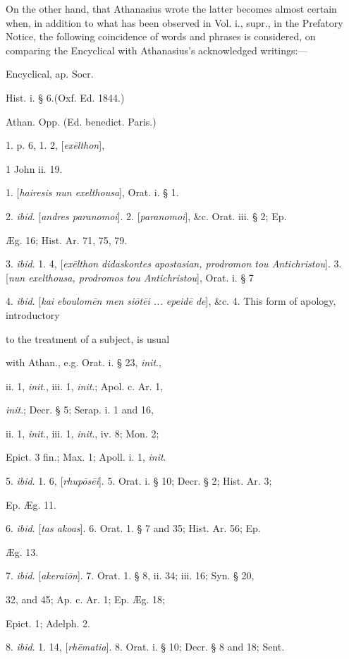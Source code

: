 On the other hand, that Athanasius wrote the
latter becomes almost certain when, in addition to what has been
observed in Vol. i., supr., in the Prefatory Notice, the following
coincidence of words and phrases is considered, on comparing the
Encyclical with Athanasius's acknowledged writings:—

Encyclical, ap. Socr.

Hist. i. § 6.(Oxf. Ed. 1844.)

Athan. Opp. (Ed. benedict. Paris.)

1. p. 6, 1. 2, [\emph{ex\={e}lthon}],

1 John ii. 19.

1. [\emph{hairesis nun exelthousa}], Orat. i. § 1.

2. \emph{ibid}. [\emph{andres paranomoi}].
2. [\emph{paranomoi}], \&c. Orat. iii. § 2;
Ep.

Æg. 16; Hist. Ar. 71, 75, 79.

3. \emph{ibid}. 1. 4, [\emph{ex\={e}lthon didaskontes apostasian, prodromon tou Antichristou}].
3. [\emph{nun exelthousa, prodromos tou Antichristou}], Orat. i. § 7

4. \emph{ibid}. [\emph{kai eboulom\={e}n men si\={o}t\={e}i ... epeid\={e} de}],
\&c.
4. This form of apology, introductory

to the treatment of a subject, is
usual

with Athan., e.g. Orat. i. § 23, \emph{init}.,

ii. 1, \emph{init}., iii. 1, \emph{init}.;
Apol. c. Ar. 1,

\emph{init}.; Decr. § 5; Serap. i. 1 and
16,

ii. 1, \emph{init}., iii. 1, \emph{init}.,
iv. 8; Mon. 2;

Epict. 3 fin.; Max. 1; Apoll. i. 1, \emph{init}.

5. \emph{ibid}. 1. 6, [\emph{rhup\={o}s\={e}i}].
5. Orat. i. § 10; Decr. § 2; Hist. Ar. 3;

Ep. Æg. 11.

6. \emph{ibid}. [\emph{tas akoas}].
6. Orat. 1. § 7 and 35; Hist. Ar. 56; Ep.

Æg. 13.

7. \emph{ibid}. [\emph{akerai\={o}n}].
7. Orat. 1. § 8, ii. 34; iii. 16; Syn. § 20,

32, and 45; Ap. c. Ar. 1; Ep. Æg. 18;

Epict. 1; Adelph. 2.

8. \emph{ibid}. 1. 14, [\emph{rh\={e}matia}].
8. Orat. i. § 10; Decr. § 8 and 18; Sent.

